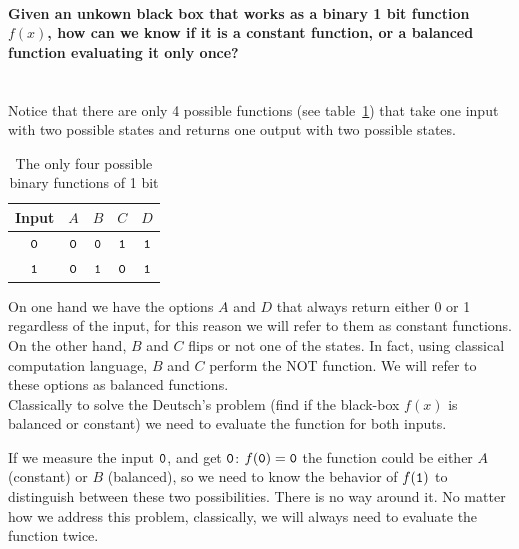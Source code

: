 \paragraph{Given an unkown black box that works as a binary 1 bit function $f(x)$, how can we know if it is a constant function, or a balanced function evaluating it only once?\\}
\textcolor{white}{.}\\
Notice that there are only 4 possible functions (see table~\ref{binfunc}) that take one input with two possible states and returns one output with two possible states.
\begin{table}[h!]
\begin{center}
\begin{tabular}{c|c|c|c|c}
\multicolumn{1}{l|}{Input} & \multicolumn{1}{l|}{$A$} & \multicolumn{1}{l|}{$B$} & \multicolumn{1}{l|}{$C$} & \multicolumn{1}{l}{$D$} \\ \hline
$\texttt{0}$ & $\texttt{0}$ & $\texttt{0}$ & $\texttt{1}$ & $\texttt{1}$ \\ %
$\texttt{1}$ & $\texttt{0}$ & $\texttt{1}$ & $\texttt{0}$ & $\texttt{1}$ \\ %
\end{tabular}
\end{center}
\vspace{-15pt}\caption{The only four possible binary functions of 1 bit}
\label{binfunc}
\end{table}

On one hand we have the options $A$ and $D$ that always return either 0 or 1 regardless of the input, for this reason we will refer to them as constant functions.
On the other hand, $B$ and $C$ flips or not one of the states. In fact, using classical computation language, $B$ and $C$ perform the NOT function. We will refer to these options as balanced functions.\\

Classically to solve the Deutsch's problem (find if the black-box $f(x)$ is balanced or constant) we need to evaluate the function for both inputs.

If we measure the input $\texttt{0}$, and get $\texttt{0}$: $f(\texttt{0})=\texttt{0}$ the function could be either $A$ (constant) or $B$ (balanced), so we need to know the behavior of $f(\texttt{1})$ to distinguish between these two possibilities.
There is no way around it. No matter how we address this problem, classically, we will always need to evaluate the function twice.

